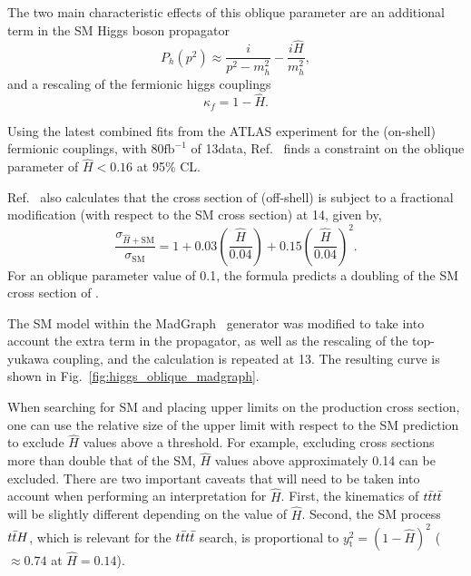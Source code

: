 The two main characteristic effects of this oblique parameter are
an additional term in the SM Higgs boson propagator
\begin{equation}
    P_h(p^2)\approx\frac{i}{p^2-m_h^2}-\frac{i\hat{H}}{m_h^2},
\end{equation}
and a rescaling of the fermionic higgs
couplings
\begin{equation}
    \kappa_f = 1-{\hat H}.
\end{equation}

Using the latest combined fits from the ATLAS experiment for the (on-shell) fermionic couplings,
with 80$\mathrm{fb}^{-1}$ of 13\TeV data, Ref.~\cite{THEORY:ObliqueHiggs2019} finds a constraint on
the oblique parameter of $\hat{H} < 0.16$ at 95\% CL.

Ref.~\cite{THEORY:ObliqueHiggs2019} also calculates that the cross section of (off-shell) \tttt is subject to a fractional modification (with respect to the SM cross section)
at 14\TeV, given by,
\begin{equation}
    \frac{\sigma_{\hat{H}+\mathrm{SM}}}{\sigma_\mathrm{SM}} = 1 + 0.03\left(\frac{\hat{H}}{0.04}\right) + 0.15\left(\frac{\hat{H}}{0.04}\right)^2.
\end{equation}
For an oblique parameter value of 0.1, the formula predicts a doubling of the SM cross section of \tttt.

The SM model within the MadGraph~\cite{THEORY:MADGRAPH5} generator was modified to take into account the extra term in the propagator, as
well as the rescaling of the top-yukawa coupling, and the calculation is repeated
at 13\TeV. The resulting curve is shown in Fig.~\ref{fig:higgs_oblique_madgraph}.

When searching for SM \tttt and placing upper limits on the production cross
section, one can use the relative size of the upper limit with respect to
the SM prediction to exclude $\hat{H}$ values above a threshold. For example,
excluding cross sections more than double that of the SM, $\hat{H}$ values
above approximately 0.14 can be excluded. There are two important caveats
that will need to be taken into account when performing an interpretation for
$\hat{H}$. First, the kinematics of $t\bar{t}t\bar{t}$ will be slightly different
depending on the value of $\hat{H}$. Second, the SM process $t\bar{t}H$, which is
relevant for the $t\bar{t}t\bar{t}$ search, is proportional to
$y_\mathrm{t}^2=(1-\hat{H})^2$ ($\approx 0.74$ at $\hat{H}=0.14$).


